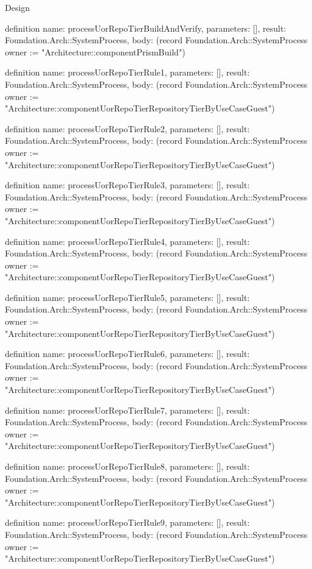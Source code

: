 \begin{lexlean}{Design}
\begin{semanticmodule}
definition{
  name: processUorRepoTierBuildAndVerify,
  parameters: [],
  result: Foundation.Arch::SystemProcess,
  body: (record Foundation.Arch::SystemProcess {owner := "Architecture::componentPrismBuild"})
}

definition{
  name: processUorRepoTierRule1,
  parameters: [],
  result: Foundation.Arch::SystemProcess,
  body: (record Foundation.Arch::SystemProcess {owner := "Architecture::componentUorRepoTierRepositoryTierByUseCaseGuest"})
}

definition{
  name: processUorRepoTierRule2,
  parameters: [],
  result: Foundation.Arch::SystemProcess,
  body: (record Foundation.Arch::SystemProcess {owner := "Architecture::componentUorRepoTierRepositoryTierByUseCaseGuest"})
}

definition{
  name: processUorRepoTierRule3,
  parameters: [],
  result: Foundation.Arch::SystemProcess,
  body: (record Foundation.Arch::SystemProcess {owner := "Architecture::componentUorRepoTierRepositoryTierByUseCaseGuest"})
}

definition{
  name: processUorRepoTierRule4,
  parameters: [],
  result: Foundation.Arch::SystemProcess,
  body: (record Foundation.Arch::SystemProcess {owner := "Architecture::componentUorRepoTierRepositoryTierByUseCaseGuest"})
}

definition{
  name: processUorRepoTierRule5,
  parameters: [],
  result: Foundation.Arch::SystemProcess,
  body: (record Foundation.Arch::SystemProcess {owner := "Architecture::componentUorRepoTierRepositoryTierByUseCaseGuest"})
}

definition{
  name: processUorRepoTierRule6,
  parameters: [],
  result: Foundation.Arch::SystemProcess,
  body: (record Foundation.Arch::SystemProcess {owner := "Architecture::componentUorRepoTierRepositoryTierByUseCaseGuest"})
}

definition{
  name: processUorRepoTierRule7,
  parameters: [],
  result: Foundation.Arch::SystemProcess,
  body: (record Foundation.Arch::SystemProcess {owner := "Architecture::componentUorRepoTierRepositoryTierByUseCaseGuest"})
}

definition{
  name: processUorRepoTierRule8,
  parameters: [],
  result: Foundation.Arch::SystemProcess,
  body: (record Foundation.Arch::SystemProcess {owner := "Architecture::componentUorRepoTierRepositoryTierByUseCaseGuest"})
}

definition{
  name: processUorRepoTierRule9,
  parameters: [],
  result: Foundation.Arch::SystemProcess,
  body: (record Foundation.Arch::SystemProcess {owner := "Architecture::componentUorRepoTierRepositoryTierByUseCaseGuest"})
}


\end{semanticmodule}
\end{lexlean}
